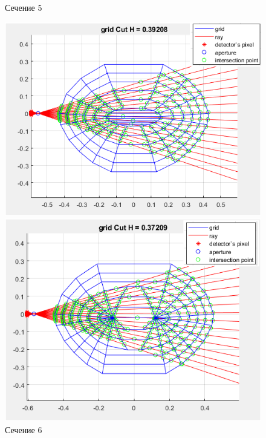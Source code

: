\documentclass[a4]{article}
\begin{document}
\begin{figure}[H]
\begin{center}
\caption{Сечение 5}
\includegraphics{pic10.png} 

\caption{Сечение 6}
\includegraphics{pic11.png} 
\end{center}
\end{figure}
\end{document}
